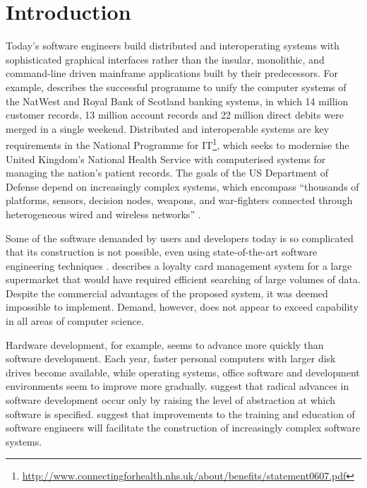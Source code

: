 


\chapter{Introduction}
\label{Introduction}
Today's software engineers build distributed and interoperating systems with sophisticated graphical interfaces rather than the insular, monolithic, and command-line driven mainframe applications built by their predecessors. For example, \cite[pg26]{rae04challenges} describes the successful programme to unify the computer systems of the NatWest and Royal Bank of Scotland banking systems, in which 14 million customer records, 13 million account records and 22 million direct debits were merged in a single weekend. Distributed and interoperable systems are key requirements in the National Programme for IT\footnote{\url{http://www.connectingforhealth.nhs.uk/about/benefits/statement0607.pdf}}, which seeks to modernise the United Kingdom's National Health Service with computerised systems for managing the nation's patient records. The goals of the US Department of Defense depend on increasingly complex systems, which encompass ``thousands of platforms, sensors, decision nodes, weapons, and war-fighters connected through heterogeneous wired and wireless networks'' \cite{northrop06ulss}.

Some of the software demanded by users and developers today is so complicated that its construction is not possible, even using state-of-the-art software engineering techniques \cite{selic03pragmatics}. \cite[pg15]{rae04challenges} describes a loyalty card management system for a large supermarket that would have required efficient searching of large volumes of data. Despite the commercial advantages of the proposed system, it was deemed impossible to implement. Demand, however, does not appear to exceed capability in all areas of computer science.


Hardware development, for example, seems to advance more quickly than software development. Each year, faster personal computers with larger disk drives become available, while operating systems, office software and development environments seem to improve more gradually. \cite{brooks86nosilverbullet,selic03pragmatics,kleppe03mda} suggest that radical advances in software development occur only by raising the level of abstraction at which software is specified. \cite{rae04challenges} suggest that improvements to the training and education of software engineers will facilitate the construction of increasingly complex software systems.



